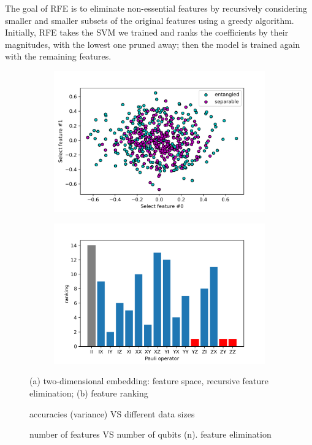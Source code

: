 \documentclass[
reprint,
aps,
pra,
]{revtex4-2}
\theoremstyle{plain}
\theoremstyle{definition}
\begin{document}
The goal of RFE is to eliminate non-essential features by recursively considering smaller and smaller subsets of the original features using a greedy algorithm. Initially, RFE takes the SVM we trained and ranks the coeﬃcients by their magnitudes, with the lowest one pruned away; then the model is trained again with the remaining features.
\begin{figure}[!ht]
	\centering
	\begin{subfigure}{0.49\textwidth}
	\centering
		\includegraphics[width=.9\linewidth]{./Code/feature_space_2.png}
	\end{subfigure}
	\begin{subfigure}{0.49\textwidth}
	\centering
		\includegraphics[width=.9\linewidth]{./Code/feature_rank.png}
	\end{subfigure}
	\caption{(a) two-dimensional embedding: feature space, recursive feature elimination; (b) feature ranking}
\end{figure}
\begin{figure}[!ht]
	\centering
	\caption{accuracies (variance) VS different data sizes}
\end{figure}
\begin{figure}[!ht]
	\centering
	\caption{number of features VS number of qubits (n). feature elimination}
\end{figure}
\end{document}
